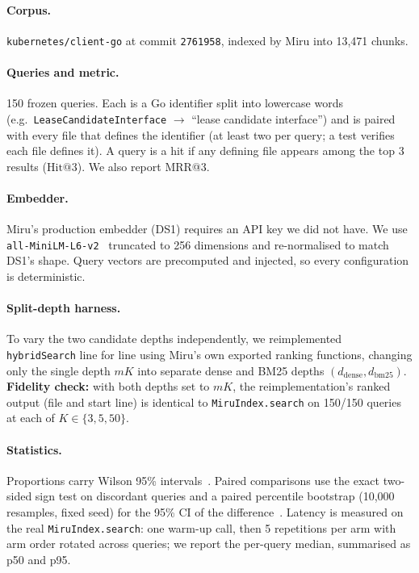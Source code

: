\documentclass[11pt, letterpaper]{article}
\makeatletter
\newcommand{\hit}{\mathrm{Hit@3}}
\newcommand{\code}[1]{\texttt{#1}}
\makeatother
\begin{document}
\paragraph{Corpus.} \code{kubernetes/client-go} at commit \code{2761958}, indexed by Miru into 13{,}471 chunks.

\paragraph{Queries and metric.} 150 frozen queries. Each is a Go identifier split into lowercase words (e.g.\
\code{LeaseCandidateInterface} $\to$ ``lease candidate interface'') and is paired with every file that defines the
identifier (at least two per query; a test verifies each file defines it). A query is a hit if any defining file
appears among the top 3 results ($\hit$). We also report MRR@3.

\paragraph{Embedder.} Miru's production embedder (DS1) requires an API key we did not have. We use
\code{all-MiniLM-L6-v2}~\cite{wang2020minilm} truncated to 256 dimensions and re-normalised to match DS1's shape.
Query vectors are precomputed and injected, so every configuration is deterministic.

\paragraph{Split-depth harness.} To vary the two candidate depths independently, we reimplemented
\code{hybridSearch} line for line using Miru's own exported ranking functions, changing only the single depth $mK$
into separate dense and BM25 depths $(d_{\mathrm{dense}}, d_{\mathrm{bm25}})$. \textbf{Fidelity check:} with both
depths set to $mK$, the reimplementation's ranked output (file and start line) is identical to
\code{MiruIndex.search} on 150/150 queries at each of $K\in\{3,5,50\}$.

\paragraph{Statistics.} Proportions carry Wilson 95\% intervals~\cite{wilson1927}. Paired comparisons use the exact
two-sided sign test on discordant queries and a paired percentile bootstrap (10{,}000 resamples, fixed seed) for the
95\% CI of the difference~\cite{efron1993bootstrap}. Latency is measured on the real \code{MiruIndex.search}: one
warm-up call, then 5 repetitions per arm with arm order rotated across queries; we report the per-query median,
summarised as p50 and p95.
\end{document}
